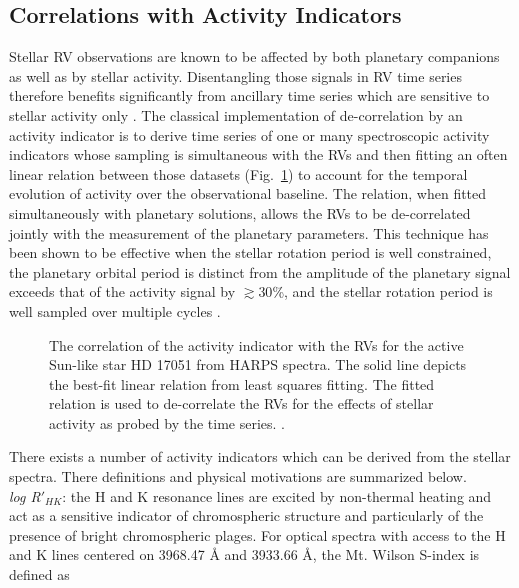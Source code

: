 \subsection{Correlations with Activity Indicators}
Stellar RV observations are known to be affected by both planetary companions as
well as by stellar activity. Disentangling those signals in RV time series
therefore benefits significantly from ancillary time series which are sensitive
to stellar activity only \citep{boisse09}.
The classical implementation of de-correlation by
an activity indicator is to derive time series of one or many spectroscopic
activity indicators whose sampling is simultaneous with the RVs and then
fitting an often linear relation between those datasets (Fig.~\ref{fig:corr}) to
account for the temporal evolution of activity over the observational baseline.
The relation, when fitted simultaneously with planetary solutions, allows the RVs
to be de-correlated jointly with the measurement of the planetary parameters.
This technique has been shown to be effective when the stellar rotation period
\prot{} is well constrained, the planetary orbital period is distinct from
\prot{,} the amplitude of the planetary signal exceeds that of the activity signal
by $\gtrsim 30$\%, and the stellar rotation period is well sampled over multiple
cycles \citep{boisse11}. \\

\begin{figure}
  \centering
  \caption{The correlation of the \vspan{} activity indicator with the RVs for the
    active Sun-like star HD 17051 from HARPS spectra. The solid line depicts the
    best-fit linear relation from least squares fitting. The fitted relation is
    used to de-correlate the RVs for the effects of stellar activity as probed by
    the \vspan{} time series. \citep[Image credit:][]{boisse11}.}
  \label{fig:corr}
\end{figure}

There exists a number of activity indicators which can be derived from the stellar
spectra. There definitions and physical motivations are summarized below. \\

\emph{log R$'_{HK}$}:
the \caii{} H and K resonance lines are excited by non-thermal heating 
and act as a sensitive indicator of chromospheric structure and particularly of
the presence of bright chromospheric plages. 
For optical spectra with access to the \caii{} H and K lines
centered on 3968.47 \AA{} and 3933.66 \AA{,} the Mt. Wilson S-index is defined as


